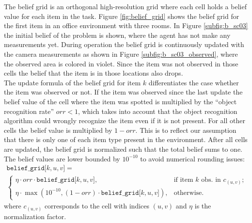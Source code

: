 The belief grid is an orthogonal high-resolution grid where each cell holds a belief value for each item in the task. Figure \ref{fig:belief_grid} shows the belief grid for the first item in an office environment with three rooms. In Figure \ref{subfig:b_sc03} the initial belief of the problem is shown, where the agent has not make any measurements yet. During operation the belief grid is continuously updated with the camera measurements as shown in Figure \ref{subfig:b_sc03_observed}, where the observed area is colored in violet. Since the item was not observed in those cells the belief that the item is in those locations also drops.\\

The update formula of the belief grid for item $k$ differentiates the case whether the item was observed or not. If the item was observed since the last update the belief value of the cell where the item was spotted is multiplied by the “object recognition rate” $orr<1$, which takes into account that the object recognition algorithm could wrongly recognize the item even if it is not present. For all other cells the belief value is multiplied by $1 - orr$. This is to reflect our assumption that there is only one of each item type present in the environment. After all cells are updated, the belief grid is normalized such that the total belief sums to one. The belief values are lower bounded by $10^{-10}$ to avoid numerical rounding issues: 
%
\begin{multline}\label{eq:belief_grid1}
    \texttt{belief\_grid[$k, u, v$]} =\\ 
    \begin{cases} 
        \eta \cdot orr \cdot \texttt{belief\_grid[$k, u, v$]}, &\text{if item $k$ obs. in }c_{(u,v)}; \\
        \eta \cdot \max\left(10^{-10}, (1 - orr) \cdot \texttt{belief\_grid[$k, u, v$]}\right), &\text{otherwise}.
    \end{cases}
\end{multline}
% 
where $c_{(u,v)}$ corresponds to the cell with indices $(u,v)$ and $\eta$ is the normalization factor.\\

